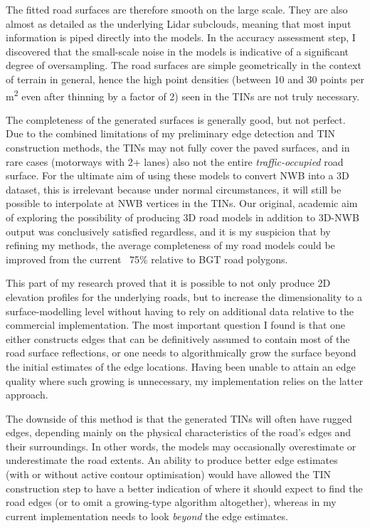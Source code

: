 The fitted road surfaces are therefore smooth on the large scale. They are also almost as detailed as the underlying Lidar subclouds, meaning that most input information is piped directly into the models. In the accuracy assessment step, I discovered that the small-scale noise in the models is indicative of a significant degree of oversampling. The road surfaces are simple geometrically in the context of terrain in general, hence the high point densities (between 10 and 30 points per m\textsuperscript{2} even after thinning by a factor of 2) seen in the TINs are not truly necessary.

The completeness of the generated surfaces is generally good, but not perfect. Due to the combined limitations of my preliminary edge detection and TIN construction methods, the TINs may not fully cover the paved surfaces, and in rare cases (motorways with 2+ lanes) also not the entire \textit{traffic-occupied} road surface. For the ultimate aim of using these models to convert NWB into a 3D dataset, this is irrelevant because under normal circumstances, it will still be possible to interpolate at NWB vertices in the TINs. Our original, academic aim of exploring the possibility of producing 3D road models in addition to 3D-NWB output was conclusively satisfied regardless, and it is my suspicion that by refining my methods, the average completeness of my road models could be improved from the current ~75\% relative to BGT road polygons.

This part of my research proved that it is possible to not only produce 2D elevation profiles for the underlying roads, but to increase the dimensionality to a surface-modelling level without having to rely on additional data relative to the commercial implementation. The most important question I found is that one either constructs edges that can be definitively assumed to contain most of the road surface reflections, or one needs to algorithmically grow the surface beyond the initial estimates of the edge locations. Having been unable to attain an edge quality where such growing is unnecessary, my implementation relies on the latter approach.

The downside of this method is that the generated TINs will often have rugged edges, depending mainly on the physical characteristics of the road's edges and their surroundings. In other words, the models may occasionally overestimate or underestimate the road extents. An ability to produce better edge estimates (with or without active contour optimisation) would have allowed the TIN construction step to have a better indication of where it should expect to find the road edges (or to omit a growing-type algorithm altogether), whereas in my current implementation needs to look \textit{beyond} the edge estimates.

